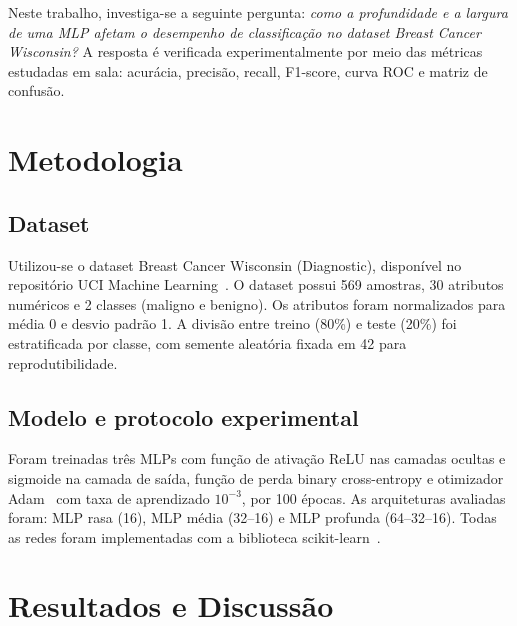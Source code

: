 \documentclass[conference]{IEEEtran}
\begin{document}
Neste trabalho, investiga-se a seguinte pergunta: \emph{como a
profundidade e a largura de uma MLP afetam o desempenho de
classificação no dataset Breast Cancer Wisconsin?} A resposta é
verificada experimentalmente por meio das métricas estudadas em sala:
acurácia, precisão, recall, F1-score, curva ROC e matriz de confusão.

\section{Metodologia}

\subsection{Dataset}
Utilizou-se o dataset Breast Cancer Wisconsin (Diagnostic), disponível
no repositório UCI Machine Learning~\cite{kelly2023uci}. O dataset
possui 569 amostras, 30 atributos numéricos e 2 classes (maligno e
benigno). Os atributos foram normalizados para média 0 e desvio padrão
1. A divisão entre treino (80\%) e teste (20\%) foi estratificada por
classe, com semente aleatória fixada em 42 para reprodutibilidade.

\subsection{Modelo e protocolo experimental}
Foram treinadas três MLPs com função de ativação ReLU nas camadas
ocultas e sigmoide na camada de saída, função de perda
binary cross-entropy e otimizador Adam~\cite{kingma2015adam} com taxa de
aprendizado $10^{-3}$, por 100 épocas. As arquiteturas avaliadas foram:
MLP rasa (16), MLP média (32--16) e MLP profunda (64--32--16). Todas as
redes foram implementadas com a biblioteca scikit-learn~\cite{pedregosa2011scikit}.

\section{Resultados e Discussão}
\end{document}
